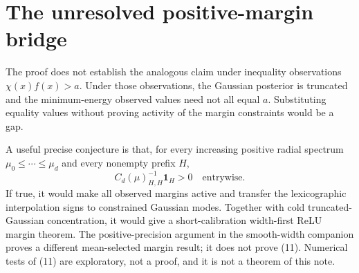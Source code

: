 \documentclass[11pt]{article}
\newcommand{\one}{\mathbf1}
\begin{document}
\section{The unresolved positive-margin bridge}
The proof does not establish the analogous claim under inequality
observations $\chi(x)f(x)>a$. Under those observations, the Gaussian
posterior is truncated and the minimum-energy observed values need not
all equal $a$. Substituting equality values without proving activity
of the margin constraints would be a gap.

A useful precise conjecture is that, for every increasing positive radial
spectrum $\mu_0\le\cdots\le\mu_d$ and every nonempty prefix $H$,
\[
                        C_d(\mu)_{H,H}^{-1}\one_H>0
                          \quad\text{entrywise}.             \tag{11}
\]
If true, it would make all observed margins active and transfer the
lexicographic interpolation signs to constrained Gaussian modes.
Together with cold truncated-Gaussian concentration, it would give a
short-calibration width-first ReLU margin theorem. The positive-precision
argument in the smooth-width companion proves a different mean-selected
margin result; it does not prove (11). Numerical tests of (11) are
exploratory, not a proof, and it is not a theorem of this note.
\end{document}

